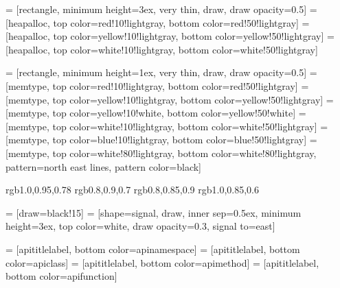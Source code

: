   = [rectangle, minimum height=3ex, very thin, draw, draw opacity=0.5]
 = [heapalloc, top color=red!10!lightgray,
                                     bottom color=red!50!lightgray]
 = [heapalloc, top color=yellow!10!lightgray,
                                     bottom color=yellow!50!lightgray]
  = [heapalloc, top color=white!10!lightgray,
                                     bottom color=white!50!lightgray]

     = [rectangle, minimum height=1ex, very thin, draw,
                           draw opacity=0.5]
     = [memtype, top color=red!10!lightgray,
                                    bottom color=red!50!lightgray]
     = [memtype, top color=yellow!10!lightgray,
                                    bottom color=yellow!50!lightgray]
   = [memtype, top color=yellow!10!white,
                                    bottom color=yellow!50!white]
    = [memtype, top color=white!10!lightgray,
                                    bottom color=white!50!lightgray]
  = [memtype, top color=blue!10!lightgray,
                                    bottom color=blue!50!lightgray]
 = [memtype, top color=white!80!lightgray,
                                    bottom color=white!80!lightgray,
                                    pattern=north east lines,
                                    pattern color=black]


%
%
\definecolor{apinamespace} {rgb}{1.0,0.95,0.78}
\definecolor{apimethod}    {rgb}{0.8,0.9,0.7}
\definecolor{apiclass}     {rgb}{0.8,0.85,0.9}
\definecolor{apifunction}  {rgb}{1.0,0.85,0.6}

%
%
    = [draw=black!15]
 = [shape=signal, draw, inner sep=0.5ex,
                             minimum height=3ex, top color=white,
                             draw opacity=0.3,
                             signal to=east]

 = [apititlelabel, bottom color=apinamespace]
     = [apititlelabel, bottom color=apiclass]
    = [apititlelabel, bottom color=apimethod]
  = [apititlelabel, bottom color=apifunction]

